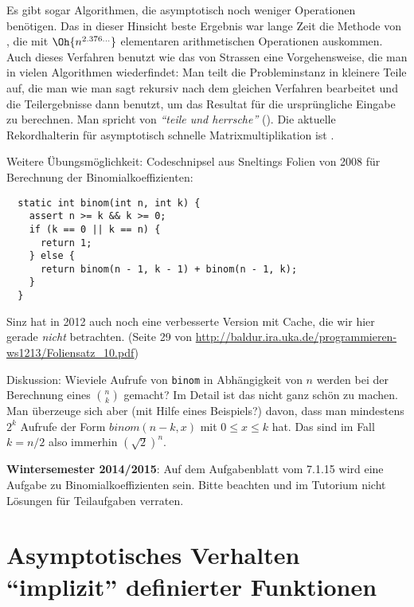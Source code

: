 Es gibt sogar Algorithmen, die asymptotisch noch weniger Operationen
benötigen. Das in dieser Hinsicht beste Ergebnis war lange Zeit die
Methode von \textcite{Coppersmith_1990_MMA_ar}, die mit $\Oh{n^{2.376\dots}}$
elementaren arithmetischen Operationen auskommen. Auch dieses
Verfahren benutzt wie das von Strassen eine Vorgehensweise, die man in
vielen Algorithmen wiederfindet: Man teilt die Probleminstanz in
kleinere Teile auf, die man wie man sagt rekursiv nach dem gleichen
Verfahren bearbeitet und die Teilergebnisse dann benutzt, um das
Resultat für die ursprüngliche Eingabe zu berechnen. Man spricht von
\emph{"`teile und herrsche"'} (). Die
aktuelle Rekordhalterin für asymptotisch schnelle Matrixmultiplikation
ist \textcite{Vassilevska_2012_MMF_ip}.


\begin{tutorium}
  Weitere Übungsmöglichkeit: Codeschnipsel aus Sneltings Folien von
  2008 für Berechnung der Binomialkoeffizienten:
\begin{verbatim}
  static int binom(int n, int k) {
    assert n >= k && k >= 0;
    if (k == 0 || k == n) {
      return 1;
    } else {
      return binom(n - 1, k - 1) + binom(n - 1, k);
    }
  }
\end{verbatim}
  Sinz hat in 2012 auch noch eine verbesserte Version mit Cache, die
  wir hier gerade \emph{nicht} betrachten.
  (Seite 29 von \url{http://baldur.ira.uka.de/programmieren-ws1213/Foliensatz_10.pdf})

  Diskussion: Wieviele Aufrufe von \verb|binom| in Abhängigkeit von
  $n$ werden bei der Berechnung eines $\binom{n}{k}$ gemacht? Im
  Detail ist das nicht ganz schön zu machen. Man überzeuge sich aber
  (mit Hilfe eines Beispiels?) davon, dass man mindestens $2^k$ Aufrufe
  der Form $binom(n-k,x)$ mit $0\leq x\leq k$ hat. Das sind im Fall
  $k=n/2$ also immerhin $\left(\sqrt{2}\right)^n$.

  \textbf{Wintersemester 2014/2015}: Auf dem Aufgabenblatt vom 7.1.15
  wird eine Aufgabe zu Binomialkoeffizienten sein. Bitte beachten und
  im Tutorium nicht Lösungen für Teilaufgaben verraten.
\end{tutorium}

\Tut\section{Asymptotisches Verhalten "`implizit"' definierter Funktionen}
\label{sec:master-theorem}

